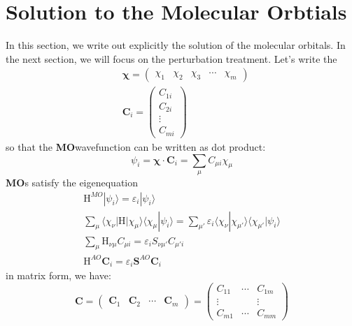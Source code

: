 \documentclass{article}
\newcommand{\MO}{\textbf{MO}}
\newcommand{\statebra}[1]{\langle #1 |}
\newcommand{\stateket}[1]{| #1 \rangle}
\begin{document}
\section{Solution to the Molecular Orbtials}
In this section, we write out explicitly the solution of the molecular orbitals. In the next section,
we will focus on the perturbation treatment. 
Let's write the 
\begin{align}
    &\mathbf{\chi} = \left( \begin{matrix}
        \chi_1& \chi_2& \chi_3& \cdots& \chi_m
    \end{matrix} \right) \\
    &\mathbf{C}_i = \left( \begin{matrix}
        C_{1i} \\ C_{2i} \\ \vdots \\ C_{mi}
    \end{matrix} \right)
\end{align}
so that the \MO wavefunction can be written as dot product:
\begin{equation}
    \psi_i = \mathbf{\chi}\cdot \mathbf{C}_i = \sum_{\mu} C_{\mu i} \chi_{\mu}
\end{equation}
\MO s satisfy the eigenequation 
\begin{gather}
    \text{H}^{MO} \stateket{\psi_i} = \varepsilon_i \stateket{\psi_i} \\ 
    \sum_{\mu} \statebra{\chi_{\nu}}\text{H}\stateket{\chi_{\mu}}\statebra{\chi_{\mu}} \psi_i \rangle  = \sum_{\mu'} \varepsilon_i \statebra{\chi_{\nu}} \chi_{\mu'} \rangle \statebra{\chi_{\mu'}} \psi_i \rangle \\ 
    \sum_{\mu} \text{H}_{\nu\mu} C_{\mu i} =  \varepsilon_i S_{\nu \mu'} C_{\mu' i} \\ 
    \text{H}^{AO} \mathbf{C}_i = \varepsilon_i \mathbf{S}^{AO} \mathbf{C}_i
\end{gather}
in matrix form, we have:
\begin{equation}
    \mathbf{C} = \left( \begin{matrix} \mathbf{C}_1 & \mathbf{C}_2 & \cdots & \mathbf{C}_m \end{matrix} \right) 
    = \left( \begin{matrix}
        C_{11} & \cdots & C_{1m} \\
        \vdots & & \vdots \\ 
        C_{m1} & \cdots & C_{mm}  
    \end{matrix}\right)
\end{equation}
\end{document}
